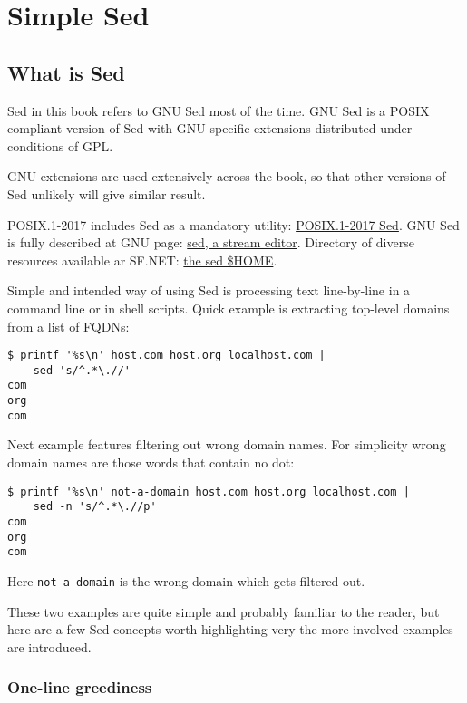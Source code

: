 \chapter{Simple Sed}
\section{What is Sed}
Sed in this book refers to GNU Sed most of the time.
GNU Sed is a POSIX compliant version of Sed with GNU specific extensions
distributed under conditions of GPL.

GNU extensions are used extensively across the book, so that other
versions of Sed unlikely will give similar result.

POSIX.1-2017 includes Sed as a mandatory utility:
\href{https://pubs.opengroup.org/onlinepubs/9699919799/utilities/sed.html}{POSIX.1-2017 Sed}.
GNU Sed is fully described at GNU page: \href{https://www.gnu.org/software/sed/manual/sed.html}{sed, a stream editor}.
Directory of diverse resources available ar SF.NET:
\href{http://sed.sourceforge.net/}{the sed \$HOME}.

Simple and intended way of using Sed is processing text line-by-line
in a command line or in shell scripts. Quick example is extracting top-level
domains from a list of FQDNs:

\begin{lstlisting}
$ printf '%s\n' host.com host.org localhost.com |
	sed 's/^.*\.//'
com
org
com
\end{lstlisting}

Next example features filtering out wrong domain names.
For simplicity wrong domain names are
those words that contain no dot:

\begin{lstlisting}[caption={Simple filtering},label={lst:simple-filtering}]
$ printf '%s\n' not-a-domain host.com host.org localhost.com |
	sed -n 's/^.*\.//p'
com
org
com
\end{lstlisting}

Here \lstinline{not-a-domain} is the wrong domain which gets filtered out.

These two examples are quite simple and probably familiar to the reader,
but here are a few Sed concepts worth highlighting very the more
involved examples are introduced.

\subsection{One-line greediness}


